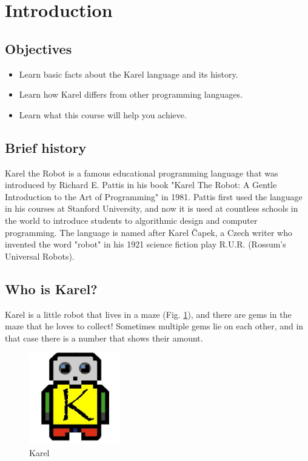 \section{Introduction}

\subsection{Objectives} 

\begin{itemize}
\item Learn basic facts about the Karel language and its history. 
\item Learn how Karel differs from other programming languages.
\item Learn what this course will help you achieve.
\end{itemize}

\subsection{Brief history}

Karel the Robot is a famous educational programming language that was introduced by Richard E. 
Pattis in his book "Karel The Robot: A Gentle Introduction to the Art of Programming" in 1981. 
Pattis first used the language in his courses at Stanford University, and now it is used at 
countless schools in the world to introduce students to algorithmic design and computer programming. 
The language is named after Karel \v{C}apek, a Czech writer who invented the word "robot" in his 1921 
science fiction play R.U.R. (Rossum's Universal Robots).

\subsection{Who is Karel?}

Karel is a little robot that lives in a maze (Fig. \ref{fig:init45}), 
and there are gems in the maze that he loves to collect!
Sometimes multiple gems lie on each other, and in that case there is a number that shows their amount.
\begin{figure}[!ht]
\begin{center}
\includegraphics[width=40mm]{imgk/karel_logo.jpg}
\end{center}
\vspace{-2mm}
\caption{Karel}
\label{fig:init45}
\end{figure}

